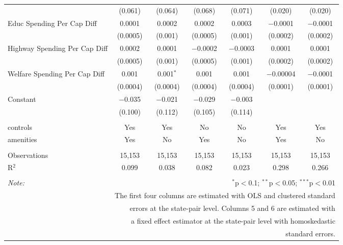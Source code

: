 \begin{table}[!htbp]
\begin{tabular}{@{\extracolsep{5pt}}lcccccc}
  & (0.061) & (0.064) & (0.068) & (0.071) & (0.020) & (0.020) \\ 
  Educ Spending Per Cap Diff & 0.0001 & 0.0002 & 0.0002 & 0.0003 & $-$0.0001 & $-$0.0001 \\ 
  & (0.0005) & (0.001) & (0.0005) & (0.001) & (0.0002) & (0.0002) \\ 
  Highway Spending Per Cap Diff & 0.0002 & 0.0001 & $-$0.0002 & $-$0.0003 & 0.0001 & 0.0001 \\ 
  & (0.0005) & (0.001) & (0.0005) & (0.001) & (0.0002) & (0.0002) \\ 
  Welfare Spending Per Cap Diff & 0.001 & 0.001$^{*}$ & 0.001 & 0.001 & $-$0.00004 & $-$0.0001 \\ 
  & (0.0004) & (0.0004) & (0.0004) & (0.0004) & (0.0001) & (0.0001) \\ 
  Constant & $-$0.035 & $-$0.021 & $-$0.029 & $-$0.003 &  &  \\ 
  & (0.100) & (0.112) & (0.105) & (0.114) &  &  \\ 
 \hline \\[-1.8ex] 
controls & Yes & Yes & No & No & Yes & Yes \\ 
amenities & Yes & No & Yes & No & Yes & No \\ 
\hline \\[-1.8ex] 
Observations & 15,153 & 15,153 & 15,153 & 15,153 & 15,153 & 15,153 \\ 
R$^{2}$ & 0.099 & 0.038 & 0.082 & 0.023 & 0.298 & 0.266 \\ 
\hline 
\hline \\[-1.8ex] 
\textit{Note:}  & \multicolumn{6}{r}{$^{*}$p$<$0.1; $^{**}$p$<$0.05; $^{***}$p$<$0.01} \\ 
 & \multicolumn{6}{r}{The first four columns are estimated with OLS and clustered standard} \\ 
 & \multicolumn{6}{r}{ errors at the state-pair level. Columns 5 and 6 are estimated with} \\ 
 & \multicolumn{6}{r}{a fixed effect estimator at the state-pair level with homoskedastic} \\ 
 & \multicolumn{6}{r}{standard errors.} \\ 
\end{tabular} 
\end{table} 

